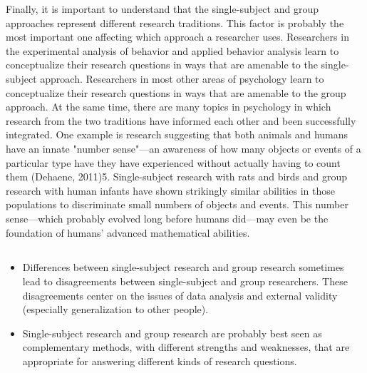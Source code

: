Finally, it is important to understand that the single-subject and group approaches represent different research traditions. This factor is probably the most important one affecting which approach a researcher uses. Researchers in the experimental analysis of behavior and applied behavior analysis learn to conceptualize their research questions in ways that are amenable to the single-subject approach. Researchers in most other areas of psychology learn to conceptualize their research questions in ways that are amenable to the group approach. At the same time, there are many topics in psychology in which research from the two traditions have informed each other and been successfully integrated. One example is research suggesting that both animals and humans have an innate "number sense"---an awareness of how many objects or events of a particular type have they have experienced without actually having to count them (Dehaene, 2011)5. Single-subject research with rats and birds and group research with human infants have shown strikingly similar abilities in those populations to discriminate small numbers of objects and events. This number sense---which probably evolved long before humans did---may even be the foundation of humans' advanced mathematical abilities.


 
\subsection{}

 
\begin{fullwidth}

 
\begin{itemize}

 

 
\item Differences between single-subject research and group research sometimes lead to disagreements between single-subject and group researchers. These disagreements center on the issues of data analysis and external validity (especially generalization to other people).

 
\item Single-subject research and group research are probably best seen as complementary methods, with different strengths and weaknesses, that are appropriate for answering different kinds of research questions.

 
\end{itemize}

 
\end{fullwidth}

